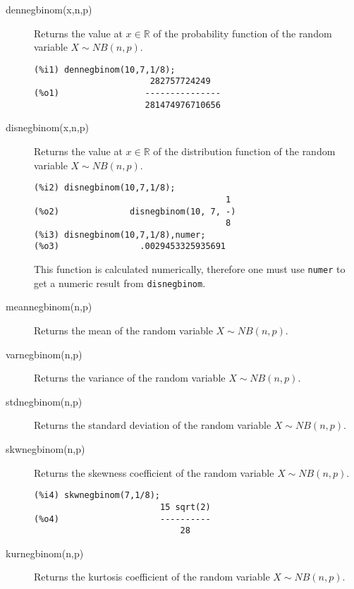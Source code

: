 \documentclass[12pt,a4paper]{article}
\newcommand{\R}{\mathbb{R}}
\begin{document}
\begin{description}

\item[dennegbinom(x,n,p)] Returns the value at $x \in \R$ of the probability function of the random variable $X \sim NB(n,p)$.

\begin{verbatim}
(%i1) dennegbinom(10,7,1/8);
                       282757724249
(%o1)                 ---------------
                      281474976710656
\end{verbatim}

\item[disnegbinom(x,n,p)] Returns the value at $x \in \R$ of the distribution function of the random variable $X \sim NB(n,p)$.

\begin{verbatim}
(%i2) disnegbinom(10,7,1/8);
                                      1
(%o2)              disnegbinom(10, 7, -)
                                      8
(%i3) disnegbinom(10,7,1/8),numer;
(%o3)                .0029453325935691
\end{verbatim}
This function is calculated numerically, therefore one must use \verb|numer| to get a numeric result from \verb|disnegbinom|.

\item[meannegbinom(n,p)] Returns the mean of the random variable  $X \sim NB(n,p)$.

\item[varnegbinom(n,p)] Returns the variance of the random variable  $X \sim NB(n,p)$.

\item[stdnegbinom(n,p)] Returns the standard deviation of the random variable  $X \sim NB(n,p)$.

\item[skwnegbinom(n,p)] Returns the skewness coefficient of the random variable  $X \sim NB(n,p)$.

\begin{verbatim}
(%i4) skwnegbinom(7,1/8);
                         15 sqrt(2)
(%o4)                    ----------
                             28
\end{verbatim}

\item[kurnegbinom(n,p)] Returns the kurtosis coefficient of the random variable $X \sim NB(n,p)$.

\end{description}


\end{document}
